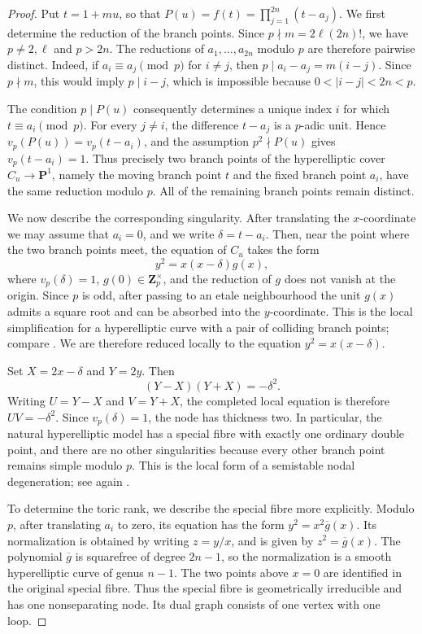 \documentclass[11pt,hidelinks]{amsart}
\newcommand{\Z}{\mathbf Z}
\newcommand{\PP}{\mathbf P}
\begin{document}
\begin{proof}
Put $t=1+mu$, so that
$P(u)=f(t)=\prod_{j=1}^{2n}(t-a_j)$.  We first determine the reduction
of the branch points.  Since $p\nmid m=2\ell(2n)!$, we have
$p\neq2,\ell$ and $p>2n$.  The reductions of
$a_1,\ldots,a_{2n}$ modulo $p$ are therefore pairwise distinct.
Indeed, if $a_i\equiv a_j\pmod p$ for $i\neq j$, then
$p\mid a_i-a_j=m(i-j)$.  Since $p\nmid m$, this would imply
$p\mid i-j$, which is impossible because $0<|i-j|<2n<p$.

The condition $p\mid P(u)$ consequently determines a unique index
$i$ for which $t\equiv a_i\pmod p$.  For every $j\neq i$, the
difference $t-a_j$ is a $p$-adic unit.  Hence
$v_p(P(u))=v_p(t-a_i)$, and the assumption $p^2\nmid P(u)$ gives
$v_p(t-a_i)=1$.  Thus precisely two branch points of the hyperelliptic
cover $C_u\rightarrow\PP^1$, namely the moving branch point $t$ and
the fixed branch point $a_i$, have the same reduction modulo $p$.
All of the remaining branch points remain distinct.

We now describe the corresponding singularity.  After translating the
$x$-coordinate we may assume that $a_i=0$, and we write
$\delta=t-a_i$.  Then, near the point where the two branch points meet,
the equation of $C_u$ takes the form
\[
 y^2=x(x-\delta)g(x),
\]
where $v_p(\delta)=1$, $g(0)\in\Z_p^\times$, and the reduction of
$g$ does not vanish at the origin.  Since $p$ is odd, after passing to
an etale neighbourhood the unit $g(x)$ admits a square root and can be
absorbed into the $y$-coordinate.  This is the local
simplification for a hyperelliptic curve with a pair of colliding
branch points; compare
\cite[Propositions~2.2 and~2.3]{AriasDeReynaEtAl2016}.
We are therefore reduced locally to the equation
$y^2=x(x-\delta)$.

Set $X=2x-\delta$ and $Y=2y$.  Then
\[
 (Y-X)(Y+X)=-\delta^2.
\]
Writing $U=Y-X$ and $V=Y+X$, the completed local equation is therefore
$UV=-\delta^2$.  Since $v_p(\delta)=1$, the node has thickness two.
In particular, the natural hyperelliptic model has a special fibre
with exactly one ordinary double point, and there are no other
singularities because every other branch point remains simple modulo
$p$.  This is the local form of a semistable nodal
degeneration; see again
\cite[Propositions~2.2 and~2.3]{AriasDeReynaEtAl2016}.

To determine the toric rank, we describe the special fibre more explicitly.  Modulo
$p$, after translating $a_i$ to zero, its equation has the form
$y^2=x^2\overline g(x)$.  Its normalization is obtained by writing
$z=y/x$, and is given by
$z^2=\overline g(x)$.  The polynomial $\overline g$ is squarefree of
degree $2n-1$, so the normalization is a smooth hyperelliptic curve of
genus $n-1$.  The two points above $x=0$ are identified in the
original special fibre.  Thus the special fibre is geometrically
irreducible and has one nonseparating node.  Its dual graph consists
of one vertex with one loop.


\end{proof}
\end{document}
